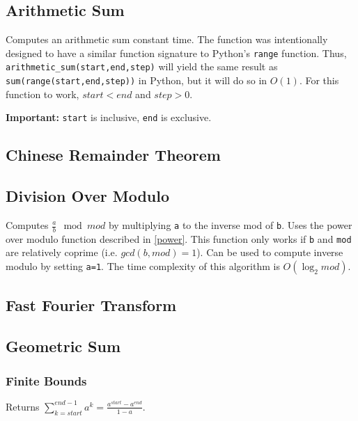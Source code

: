 \documentclass[letterpaper,11pt,twoside]{article}
\begin{document}
            \subsection{Arithmetic Sum}
                Computes an arithmetic sum constant time.
                The function was intentionally designed to have a similar function signature to Python's \verb|range| function.
                Thus, \verb|arithmetic_sum(start,end,step)| will yield the same result as \verb|sum(range(start,end,step))| in Python, but it will do so in $O(1)$.
                For this function to work, $start < end$ and $step > 0$.

                \textbf{Important:} \verb|start| is inclusive, \verb|end| is exclusive.
                
                
            \subsection{Chinese Remainder Theorem}
            \subsection{Division Over Modulo}
                Computes $\frac{a}{b} \mod mod$ by multiplying \verb|a| to the inverse mod of \verb|b|.
                Uses the power over modulo function described in \ref{power}.
                This function only works if \verb|b| and \verb|mod| are relatively coprime (i.e. $gcd(b,mod) = 1$).
                Can be used to compute inverse modulo by setting \verb|a=1|.
                The time complexity of this algorithm is $O(\log_2{mod})$.
                
                
            \subsection{Fast Fourier Transform}
            \subsection{Geometric Sum}
                \subsubsection{Finite Bounds}
                    Returns $\sum_{k=start}^{end-1}a^{k} = \frac{a^{start} - a^{end}}{1 - a}$.
                    
                    
\end{document}
